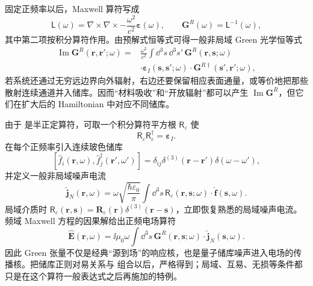 固定正频率以后，Maxwell 算符写成
\[
\mathsf L(\omega)
=\nabla\times\nabla\times
-\frac{\omega^2}{c^2}\boldsymbol\varepsilon(\omega),
\qquad
\mathbf G^R(\omega)=\mathsf L^{-1}(\omega),
\]
其中第二项按积分算符作用。由预解式恒等式可得一般非局域 Green 光学恒等式
\begin{equation}
\boxed{
\begin{aligned}
\operatorname{Im}\mathbf G^R(\mathbf r,\mathbf r';\omega)
={}&\frac{\omega^2}{c^2}
\int\dd^3s\,\dd^3s'\,
\mathbf G^R(\mathbf r,\mathbf s;\omega)\\
&\cdot\boldsymbol\varepsilon_I(\mathbf s,\mathbf s';\omega)
\cdot\mathbf G^{R\dagger}(\mathbf s',\mathbf r';\omega),
\end{aligned}}
\label{eq:nonlocal_green_optical_identity}
\end{equation}
若系统还通过无穷远边界向外辐射，右边还要保留相应表面通量，或等价地把那些散射连续通道并入储库。因而“材料吸收”和“开放辐射”都可以产生
$\operatorname{Im}\mathbf G^R$，但它们在扩大后的 Hamiltonian 中对应不同储库。

由于 是半正定算符，可取一个积分算符平方根
$\mathsf R_\varepsilon$ 使
\[
\mathsf R_\varepsilon\mathsf R_\varepsilon^\dagger
=\boldsymbol\varepsilon_I.
\]
在每个正频率引入连续玻色储库
\begin{equation}
\boxed{
[\hat f_i(\mathbf r,\omega),\hat f_j^\dagger(\mathbf r',\omega')]
=\delta_{ij}\delta^{(3)}(\mathbf r-\mathbf r')\delta(\omega-\omega'),}
\label{eq:macqed_noise_boson_commutator}
\end{equation}
并定义一般非局域噪声电流
\begin{equation}
\boxed{
\hat{\mathbf j}_{N}(\mathbf r,\omega)
=\omega\sqrt{\frac{\hbar\varepsilon_0}{\pi}}
\int\dd^3s\,
\mathsf R_\varepsilon(\mathbf r,\mathbf s;\omega)
\cdot\hat{\mathbf f}(\mathbf s,\omega).}
\label{eq:macqed_noise_current_definition}
\end{equation}
局域介质时
$\mathsf R_\varepsilon(\mathbf r,\mathbf s)=
\mathbf R_\varepsilon(\mathbf r)\delta^{(3)}(\mathbf r-\mathbf s)$，立即恢复熟悉的局域噪声电流。频域 Maxwell 方程的因果解给出正频电场算符
\begin{equation}
\boxed{
\hat{\mathbf E}(\mathbf r,\omega)
=\ii\mu_0\omega\int\dd^3s\,
\mathbf G^R(\mathbf r,\mathbf s;\omega)\cdot
\hat{\mathbf j}_{N}(\mathbf s,\omega).}
\label{eq:macqed_field_from_noise_current}
\end{equation}
因此 Green 张量不仅是经典“源到场”的响应核，也是量子储库噪声进入电场的传播核。把储库正则对易关系与 组合以后，严格得到；局域、互易、无损等条件都只是在这个算符一般表达式之后再施加的特例。

